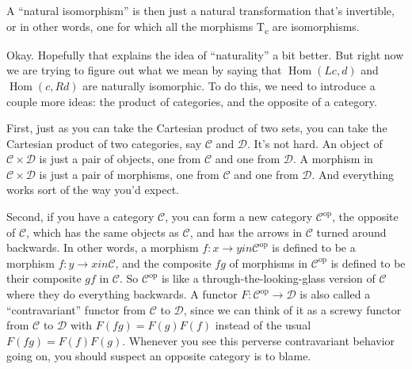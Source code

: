 \documentclass{article}
\begin{document}
A ``natural isomorphism'' is then just a natural transformation that's
invertible, or in other words, one for which all the morphisms
T\textsubscript{c} are isomorphisms.

Okay. Hopefully that explains the idea of ``naturality'' a bit better.
But right now we are trying to figure out what we mean by saying that
\(\operatorname{Hom}(Lc,d)\) and \(\operatorname{Hom}(c,Rd)\) are
naturally isomorphic. To do this, we need to introduce a couple more
ideas: the product of categories, and the opposite of a category.

First, just as you can take the Cartesian product of two sets, you can
take the Cartesian product of two categories, say \(\mathcal{C}\) and
\(\mathcal{D}\). It's not hard. An object of
\(\mathcal{C}\times\mathcal{D}\) is just a pair of objects, one from
\(\mathcal{C}\) and one from \(\mathcal{D}\). A morphism in
\(\mathcal{C}\times\mathcal{D}\) is just a pair of morphisms, one from
\(\mathcal{C}\) and one from \(\mathcal{D}\). And everything works sort
of the way you'd expect.

Second, if you have a category \(\mathcal{C}\), you can form a new
category \(\mathcal{C}^\mathrm{op}\), the opposite of \(\mathcal{C}\),
which has the same objects as \(\mathcal{C}\), and has the arrows in
\(\mathcal{C}\) turned around backwards. In other words, a morphism
\(f\colon x\to y in \mathcal{C}^\mathrm{op}\) is defined to be a
morphism \(f\colon y\to x in \mathcal{C}\), and the composite \(fg\) of
morphisms in \(\mathcal{C}^\mathrm{op}\) is defined to be their
composite \(gf\) in \(\mathcal{C}\). So \(\mathcal{C}^\mathrm{op}\) is
like a through-the-looking-glass version of \(\mathcal{C}\) where they
do everything backwards. A functor
\(F\colon\mathcal{C}^\mathrm{op}\to\mathcal{D}\) is also called a
``contravariant'' functor from \(\mathcal{C}\) to \(\mathcal{D}\), since
we can think of it as a screwy functor from \(\mathcal{C}\) to
\(\mathcal{D}\) with \(F(fg) = F(g)F(f)\) instead of the usual
\(F(fg) = F(f)F(g)\). Whenever you see this perverse contravariant
behavior going on, you should suspect an opposite category is to blame.
\end{document}
